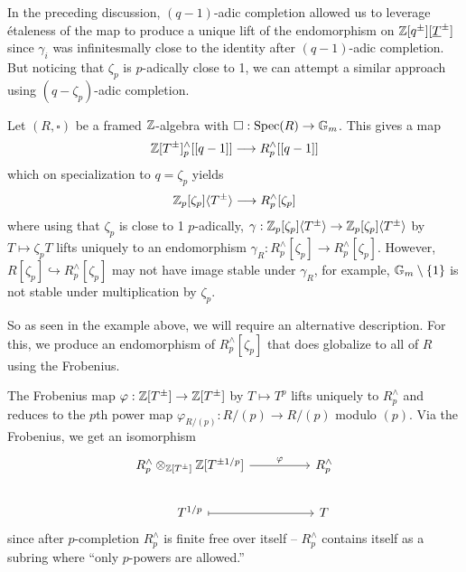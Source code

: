 In the preceding discussion, $(q-1)$-adic completion allowed us to leverage \'{e}taleness of the map to produce a unique lift of the endomorphism on $\mathbb{Z}[q^{\pm}][\underline{T}^{\pm}]$ since $\gamma_{i}$ was infinitesmally close to the identity after $(q-1)$-adic completion. But noticing that $\zeta_{p}$ is $p$-adically close to 1, we can attempt a similar approach using $(q-\zeta_{p})$-adic completion. 
\begin{example}\label{ex: not stable under aut}
    Let $(R,\square)$ be a framed $\mathbb{Z}$-algebra with $\square:\operatorname{Spec}(R)\to\mathbb{G}_{m}$. This gives a map 
    $$\mathbb{Z}[T^{\pm}]_{p}^{\wedge}[[q-1]]\longrightarrow R_{p}^{\wedge}[[q-1]]$$
    which on specialization to $q=\zeta_{p}$ yields 
    $$\mathbb{Z}_{p}[\zeta_{p}]\langle T^{\pm}\rangle\longrightarrow R_{p}^{\wedge}[\zeta_{p}]$$
    where using that $\zeta_{p}$ is close to 1 $p$-adically, $\gamma:\mathbb{Z}_{p}[\zeta_{p}]\langle T^{\pm}\rangle\to\mathbb{Z}_{p}[\zeta_{p}]\langle T^{\pm}\rangle$ by $T\mapsto \zeta_{p}T$ lifts uniquely to an endomorphism $\gamma_{R}:R_{p}^{\wedge}[\zeta_{p}]\to R_{p}^{\wedge}[\zeta_{p}]$. However, $R[\zeta_{p}]\hookrightarrow R^{\wedge}_{p}[\zeta_{p}]$ may not have image stable under $\gamma_{R}$, for example, $\mathbb{G}_{m}\setminus\{1\}$ is not stable under multiplication by $\zeta_{p}$. 
\end{example}
So as seen in the example above, we will require an alternative description. For this, we produce an endomorphism of $R_{p}^{\wedge}[\zeta_{p}]$ that does globalize to all of $R$ using the Frobenius. 
\begin{example}\label{ex: endomorphism on Rp}
    The Frobenius map $\varphi:\mathbb{Z}[T^{\pm}]\to\mathbb{Z}[T^{\pm}]$ by $T\mapsto T^{p}$ lifts uniquely to $R_{p}^{\wedge}$ and reduces to the $p$th power map $\varphi_{R/(p)}:R/(p)\to R/(p)$ modulo $(p)$. Via the Frobenius, we get an isomorphism  
    $$%
    \begin{tikzcd}
        {R^{\wedge}_{p}\otimes_{\ZZ[T^{\pm}]}\ZZ[T^{\pm1/p}]} && {R^{\wedge}_{p}} \\
        {T^{1/p}} && T
        \arrow["\varphi", from=1-1, to=1-3]
        \arrow[maps to, from=2-1, to=2-3]
    \end{tikzcd}$$
    since after $p$-completion $R_{p}^{\wedge}$ is finite free over itself -- $R_{p}^{\wedge}$ contains itself as a subring where ``only $p$-powers are allowed.''
\end{example}
